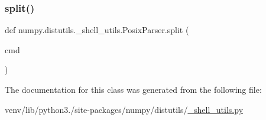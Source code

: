 \mbox{\label{classnumpy_1_1distutils_1_1__shell__utils_1_1PosixParser_a1942c3cfa01e74aa2a84ed708b63da43}} 
\subsubsection{\texorpdfstring{split()}{split()}}
{\footnotesize\ttfamily def numpy.\+distutils.\+\_\+shell\+\_\+utils.\+Posix\+Parser.\+split (\begin{DoxyParamCaption}\item[{}]{cmd }\end{DoxyParamCaption})\hspace{0.3cm}{\ttfamily [static]}}



The documentation for this class was generated from the following file\+:\begin{DoxyCompactItemize}
\item 
venv/lib/python3./site-\/packages/numpy/distutils/\hyperlink{__shell__utils_8py}{\+\_\+shell\+\_\+utils.\+py}\end{DoxyCompactItemize}
